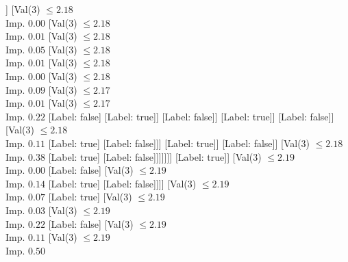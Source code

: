 \documentclass[margin=10pt]{standalone}
\begin{document}
\begin{forest}
																								[Val($3$) $ \leq 2.17$ \\ Imp. $0.44$
																									[Label: false]
																									[Label: true]]
																								[Val($3$) $ \leq 2.18$ \\ Imp. $0.00$
																									[Val($3$) $ \leq 2.18$ \\ Imp. $0.01$
																										[Val($3$) $ \leq 2.18$ \\ Imp. $0.05$
																											[Val($3$) $ \leq 2.18$ \\ Imp. $0.01$
																												[Val($3$) $ \leq 2.18$ \\ Imp. $0.00$
																													[Val($3$) $ \leq 2.18$ \\ Imp. $0.09$
																														[Val($3$) $ \leq 2.17$ \\ Imp. $0.01$
																															[Val($3$) $ \leq 2.17$ \\ Imp. $0.22$
																																[Label: false]
																																[Label: true]]
																															[Label: false]]
																														[Label: true]]
																													[Label: false]]
																												[Val($3$) $ \leq 2.18$ \\ Imp. $0.11$
																													[Label: true]
																													[Label: false]]]
																											[Label: true]]
																										[Label: false]]
																									[Val($3$) $ \leq 2.18$ \\ Imp. $0.38$
																										[Label: true]
																										[Label: false]]]]]]]
																				[Label: true]]
																			[Val($3$) $ \leq 2.19$ \\ Imp. $0.00$
																				[Label: false]
																				[Val($3$) $ \leq 2.19$ \\ Imp. $0.14$
																					[Label: true]
																					[Label: false]]]]
																		[Val($3$) $ \leq 2.19$ \\ Imp. $0.07$
																			[Label: true]
																			[Val($3$) $ \leq 2.19$ \\ Imp. $0.03$
																				[Val($3$) $ \leq 2.19$ \\ Imp. $0.22$
																					[Label: false]
																					[Val($3$) $ \leq 2.19$ \\ Imp. $0.11$
																						[Val($3$) $ \leq 2.19$ \\ Imp. $0.50$

\end{forest}
\end{document}
